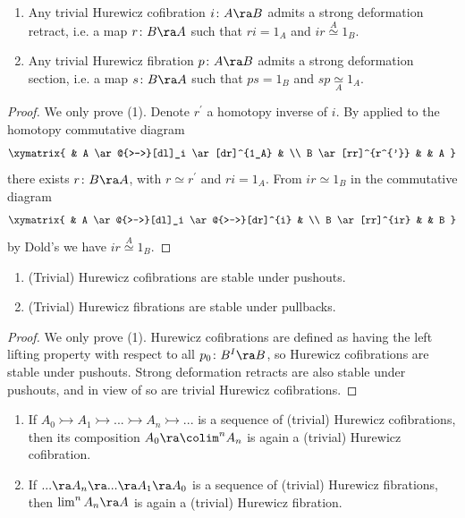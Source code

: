 \begin{lem}
\label{lem:trivhurcof}
\mbox{}
\begin{enumerate}
\item
Any trivial Hurewicz cofibration $i \colon A \ra B$ admits a strong deformation retract, i.e. a map $r \colon B \ra A$ such that $ri = 1_A$ and $ir \overset{A}{\simeq} 1_B$.
\item
Any trivial Hurewicz fibration $p \colon A \ra B$ admits a strong deformation section, i.e. a map $s \colon B \ra A$ such that $ps = 1_B$ and $sp \underset{A}{\simeq} 1_A$.
\end{enumerate}
\end{lem}

\begin{proof}
We only prove (1). Denote $r^{'}$ a homotopy inverse of $i$. By  applied to the homotopy commutative diagram
\[
\xymatrix{
  & A \ar@{>->}[dl]_i \ar[dr]^{1_A} & \\
  B \ar[rr]^{r^{'}} & & A
}
\]
there exists $r \colon B \ra A$, with $r \simeq r^{'}$ and $ri = 1_A$. From $ir \simeq 1_B$ in the commutative diagram
\[
\xymatrix{
  & A \ar@{>->}[dl]_i \ar@{>->}[dr]^{i} & \\
  B \ar[rr]^{ir} & & B
}
\]
by Dold's  we have $ir \overset{A}{\simeq} 1_B$.
\end{proof}

\begin{lem}
\label{lem:hurpush}
\mbox{}
\begin{enumerate}
\item
(Trivial) Hurewicz cofibrations are stable under pushouts.
\item
(Trivial) Hurewicz fibrations are stable under pullbacks.
\end{enumerate}
\end{lem}

\begin{proof}
We only prove (1). Hurewicz cofibrations are defined as having the left lifting property with respect to all $p_0 \colon B^I \ra B$, so Hurewicz cofibrations are stable under pushouts. Strong deformation retracts are also stable under pushouts, and in view of  so are trivial Hurewicz cofibrations.
\end{proof}

\begin{lem}
\label{lem:hurcolim}
\mbox{}
\begin{enumerate}
\item
If $A_0 \rightarrowtail A_1  \rightarrowtail ... \rightarrowtail A_n  \rightarrowtail ...$ is a sequence of (trivial) Hurewicz cofibrations, then its composition $A_0 \ra \colim^n A_n$ is again a (trivial) Hurewicz cofibration.
\item
If $... \ra A_n \ra ... \ra A_1 \ra A_0$ is a sequence of (trivial) Hurewicz fibrations, then $\lim^n A_n \ra A$ is again a (trivial) Hurewicz fibration.
\end{enumerate}
\end{lem}

